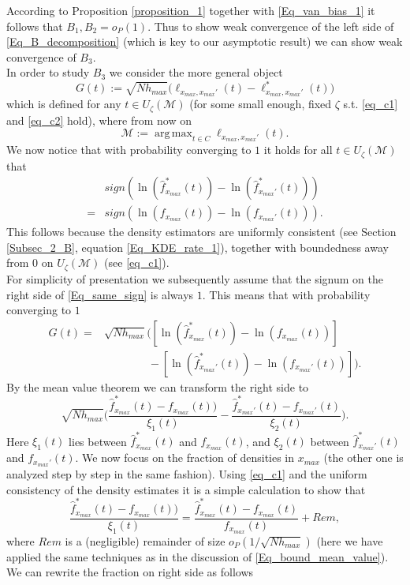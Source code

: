 \documentclass[conference]{IEEEtran}
\DeclareMathOperator*{\argmax}{arg\,max}
\begin{document}
According to Proposition \ref{proposition_1} together with \eqref{Eq_van_bias_1} it follows that $B_1, B_2 =o_P(1)$. Thus to show weak convergence of the left side of \eqref{Eq_B_decomposition} (which is key to our asymptotic result) we can show weak convergence of $B_3$.\\
In order to study $B_3$ we consider the more general object
$$
G(t) := \sqrt{N h_{max}}  \big( \ell_{x_{max},x_{max}'}( t)-\ell_{x_{max},x_{max}'}^*( t)\big)
$$
which is defined for any $t \in U_\zeta (\mathcal{M})$ (for some small enough, fixed $\zeta$ s.t. \eqref{eq_c1} and \eqref{eq_c2} hold), where from now on
$$
\mathcal{M}:= \argmax_{t \in C} \ell_{x_{max},x_{max}'}(t).
$$
 We now notice that with probability converging to $1$ it holds for all $t \in U_\zeta (\mathcal{M})$ that
\begin{align} \label{Eq_same_sign}
    & sign(\ln(\hat f_{x_{max}}^*(t))-\ln(\hat f_{x_{max}'}^*(t)))\\
    =& sign( \ln(f_{x_{max}}(t))- \ln(f_{x_{max}'}(t))). \nonumber
\end{align}
This follows because the density estimators are uniformly consistent (see Section \ref{Subsec_2_B}, equation \eqref{Eq_KDE_rate_1}), together with boundedness away from $0$ on $U_\zeta(\mathcal{M})$ (see \eqref{eq_c1}). \\
For simplicity of presentation we subsequently assume that the signum on the right side of \eqref{Eq_same_sign} is always $1$. This means that with probability converging to $1$
\begin{align*}
    G(t) = & \sqrt{N h_{max}} \big( [\ln(\hat f_{x_{max}}^*(t))-\ln(f_{x_{max}}(t))]\\
    & \quad \quad \quad \quad -[\ln(\hat f_{x_{max}'}^*(t))- \ln(f_{x_{max}'}(t))]\big).
\end{align*}
By the mean value theorem we can transform the right side to
$$
\sqrt{N h_{max}} \Big( \frac{\hat f_{x_{max}}^*(t)- f_{x_{max}}(t))}{\xi_1(t)}-\frac{\hat f_{x_{max}'}^*(t)- f_{x_{max}'}(t)}{\xi_2(t)}\Big).
$$
Here $\xi_1(t)$ lies between $\hat  f_{x_{max}}^*(t)$ and $f_{x_{max}}(t)$, and $\xi_2(t)$ between  $\hat  f_{x_{max}'}^*(t)$ and $f_{x_{max}'}(t)$. We now focus on the fraction of densities in $x_{max}$ (the other one is analyzed step by step in the same fashion). Using \eqref{eq_c1} and the uniform consistency of the density estimates it is a simple calculation to show that 
$$
\frac{\hat f_{x_{max}}^*(t)- f_{x_{max}}(t))}{\xi_1(t)} =  \frac{\hat f_{x_{max}}^*(t)- f_{x_{max}}(t)}{f_{x_{max}}(t)}+Rem,
$$
where $Rem$ is a (negligible) remainder of size $o_P(1/\sqrt{N h_{max}})$ (here we have applied the same techniques as in the discussion of \eqref{Eq_bound_mean_value}). We can rewrite the fraction on right side as follows
\end{document}
